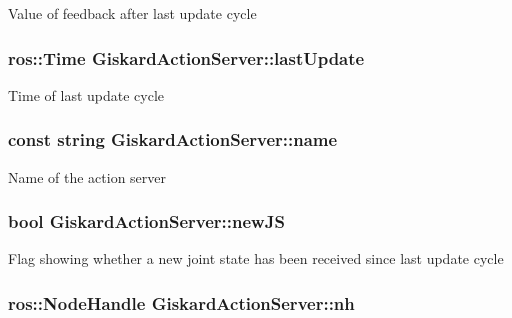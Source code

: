 Value of feedback after last update cycle \hypertarget{classGiskardActionServer_a549f8c868afd0fff8383fbbe512e4bfa}{
\subsubsection[{last\-Update}]{\setlength{\rightskip}{0pt plus 5cm}ros\-::\-Time Giskard\-Action\-Server\-::last\-Update\hspace{0.3cm}{\ttfamily [protected]}}}\label{classGiskardActionServer_a549f8c868afd0fff8383fbbe512e4bfa}
Time of last update cycle \hypertarget{classGiskardActionServer_ae1d480bfeed0f97334d25e1dfc868e67}{
\subsubsection[{name}]{\setlength{\rightskip}{0pt plus 5cm}const string Giskard\-Action\-Server\-::name\hspace{0.3cm}{\ttfamily [protected]}}}\label{classGiskardActionServer_ae1d480bfeed0f97334d25e1dfc868e67}
Name of the action server \hypertarget{classGiskardActionServer_a6af586abe01f748597efea84d3d52e21}{
\subsubsection[{new\-J\-S}]{\setlength{\rightskip}{0pt plus 5cm}bool Giskard\-Action\-Server\-::new\-J\-S\hspace{0.3cm}{\ttfamily [private]}}}\label{classGiskardActionServer_a6af586abe01f748597efea84d3d52e21}
Flag showing whether a new joint state has been received since last update cycle \hypertarget{classGiskardActionServer_a9ff54b2b5811ca6a48b5147a3799697a}{
\subsubsection[{nh}]{\setlength{\rightskip}{0pt plus 5cm}ros\-::\-Node\-Handle Giskard\-Action\-Server\-::nh\hspace{0.3cm}{\ttfamily [protected]}}}\label{classGiskardActionServer_a9ff54b2b5811ca6a48b5147a3799697a}
